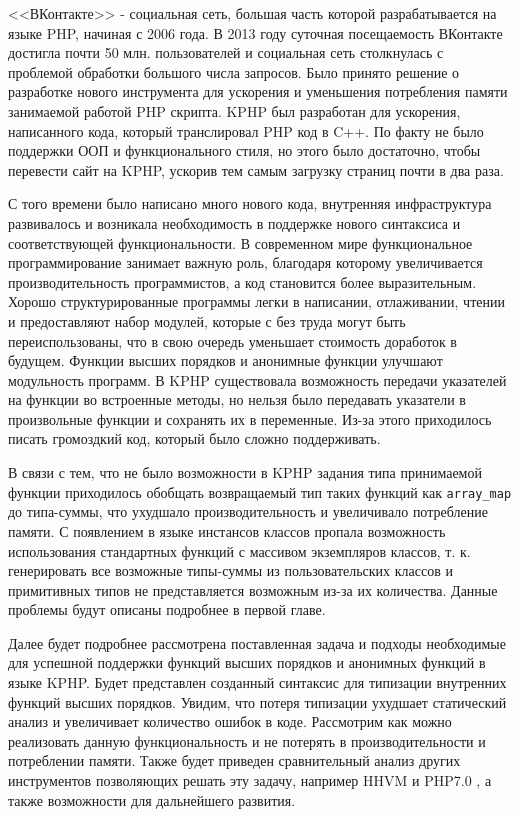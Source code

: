 \startprefacepage
<<ВКонтакте>> - социальная сеть, большая часть которой разрабатывается на языке PHP, начиная с 2006 года.
В 2013 году суточная посещаемость ВКонтакте достигла почти 50 млн. пользователей\cite{kphp-vk-2013} и социальная сеть столкнулась с проблемой обработки большого числа запросов.
Было принято решение о разработке нового инструмента для ускорения и уменьшения потребления памяти занимаемой работой PHP скрипта.
KPHP был разработан для ускорения, написанного кода, который транслировал PHP код в C++.
По факту не было поддержки ООП и функционального стиля, но этого было достаточно, чтобы перевести сайт на KPHP, ускорив тем самым загрузку страниц почти в два раза.

С того времени было написано много нового кода, внутренняя инфраструктура развивалось и возникала необходимость в поддержке нового синтаксиса и соответствующей функциональности.
В современном мире функциональное программирование занимает важную роль, благодаря которому увеличивается производительность программистов, а код становится более выразительным\cite{fp-matters}.
Хорошо структурированные программы легки в написании, отлаживании, чтении и предоставляют набор модулей, которые с без труда могут быть переиспользованы, что в свою очередь уменьшает стоимость доработок в будущем. Функции высших порядков и анонимные функции улучшают модульность программ.
В KPHP существовала возможность передачи указателей на функции во встроенные методы, но нельзя было передавать указатели в произвольные функции и сохранять их в переменные.
Из-за этого приходилось писать громоздкий код, который было сложно поддерживать.

В связи с тем, что не было возможности в KPHP задания типа принимаемой функции приходилось обобщать возвращаемый тип таких функций как \verb|array_map| до типа-суммы, что ухудшало производительность и увеличивало потребление памяти.
С появлением в языке инстансов классов пропала возможность использования стандартных функций с массивом экземпляров классов, т. к. генерировать все возможные типы-суммы из пользовательских классов и примитивных типов не представляется возможным из-за их количества.
Данные проблемы будут описаны подробнее в первой главе.

Далее будет подробнее рассмотрена поставленная задача и подходы необходимые для успешной поддержки функций высших порядков и анонимных функций в языке KPHP.
Будет представлен созданный синтаксис для типизации внутренних функций высших порядков.
Увидим, что потеря типизации ухудшает статический анализ и увеличивает количество ошибок в коде.
Рассмотрим как можно реализовать данную функциональность и не потерять в производительности и потреблении памяти.
Также будет приведен сравнительный анализ других инструментов позволяющих решать эту задачу, например HHVM \cite{hhvm} и PHP7.0 \cite{php7}, а также возможности для дальнейшего развития.
